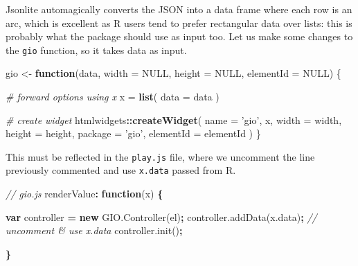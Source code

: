 \documentclass[10pt,]{krantz}
\makeatletter
\newenvironment{Shaded}{\begin{snugshade}}{\end{snugshade}}
\newcommand{\AttributeTok}[1]{\textcolor[rgb]{0.61,0.61,0.61}{#1}}
\newcommand{\CommentTok}[1]{\textcolor[rgb]{0.37,0.37,0.37}{\textit{#1}}}
\newcommand{\ControlFlowTok}[1]{\textcolor[rgb]{0.27,0.27,0.27}{\textbf{#1}}}
\newcommand{\DataTypeTok}[1]{\textcolor[rgb]{0.27,0.27,0.27}{#1}}
\newcommand{\KeywordTok}[1]{\textcolor[rgb]{0.27,0.27,0.27}{\textbf{#1}}}
\newcommand{\NormalTok}[1]{#1}
\newcommand{\OperatorTok}[1]{\textcolor[rgb]{0.43,0.43,0.43}{\textbf{#1}}}
\newcommand{\OtherTok}[1]{\textcolor[rgb]{0.37,0.37,0.37}{#1}}
\newcommand{\StringTok}[1]{\textcolor[rgb]{0.5,0.5,0.5}{#1}}
\newcommand{\VariableTok}[1]{\textcolor[rgb]{0,0,0}{#1}}
\newenvironment{kframe}{%
\medskip{}
\setlength{\fboxsep}{.8em}
 \def\at@end@of@kframe{}%
 \ifinner\ifhmode%
  \def\at@end@of@kframe{\end{minipage}}%
  \begin{minipage}{\columnwidth}%
 \fi\fi%
 \def\FrameCommand##1{\hskip\@totalleftmargin \hskip-\fboxsep
 \colorbox{shadecolor}{##1}\hskip-\fboxsep
     \hskip-\linewidth \hskip-\@totalleftmargin \hskip\columnwidth}%
 \MakeFramed {\advance\hsize-\width
   \@totalleftmargin\z@ \linewidth\hsize
   \@setminipage}}%
 {\par\unskip\endMakeFramed%
 \at@end@of@kframe}
\renewenvironment{Shaded}{\begin{kframe}}{\end{kframe}}
\makeatother
\begin{document}
Jsonlite automagically converts the JSON into a data frame where each row is an arc, which is excellent as R users tend to prefer rectangular data over lists: this is probably what the package should use as input too. Let us make some changes to the \texttt{gio} function, so it takes data as input.

\begin{Shaded}
\begin{Highlighting}[]
\NormalTok{gio <-}\StringTok{ }\ControlFlowTok{function}\NormalTok{(data, }\DataTypeTok{width =} \OtherTok{NULL}\NormalTok{, }\DataTypeTok{height =} \OtherTok{NULL}\NormalTok{, }\DataTypeTok{elementId =} \OtherTok{NULL}\NormalTok{) \{}

  \CommentTok{# forward options using x}
\NormalTok{  x =}\StringTok{ }\KeywordTok{list}\NormalTok{(}
    \DataTypeTok{data =}\NormalTok{ data}
\NormalTok{  )}

  \CommentTok{# create widget}
\NormalTok{  htmlwidgets}\OperatorTok{::}\KeywordTok{createWidget}\NormalTok{(}
    \DataTypeTok{name =} \StringTok{'gio'}\NormalTok{,}
\NormalTok{    x,}
    \DataTypeTok{width =}\NormalTok{ width,}
    \DataTypeTok{height =}\NormalTok{ height,}
    \DataTypeTok{package =} \StringTok{'gio'}\NormalTok{,}
    \DataTypeTok{elementId =}\NormalTok{ elementId}
\NormalTok{  )}
\NormalTok{\}}
\end{Highlighting}
\end{Shaded}

This must be reflected in the \texttt{play.js} file, where we uncomment the line previously commented and use \texttt{x.data} passed from R.

\begin{Shaded}
\begin{Highlighting}[]
\CommentTok{// gio.js}
\NormalTok{renderValue}\OperatorTok{:} \KeywordTok{function}\NormalTok{(x) }\OperatorTok{\{}

  \KeywordTok{var}\NormalTok{ controller }\OperatorTok{=} \KeywordTok{new} \VariableTok{GIO}\NormalTok{.}\AttributeTok{Controller}\NormalTok{(el)}\OperatorTok{;}
  \VariableTok{controller}\NormalTok{.}\AttributeTok{addData}\NormalTok{(}\VariableTok{x}\NormalTok{.}\AttributeTok{data}\NormalTok{)}\OperatorTok{;} \CommentTok{// uncomment & use x.data}
  \VariableTok{controller}\NormalTok{.}\AttributeTok{init}\NormalTok{()}\OperatorTok{;}

\OperatorTok{\}}
\end{Highlighting}
\end{Shaded}
\end{document}
